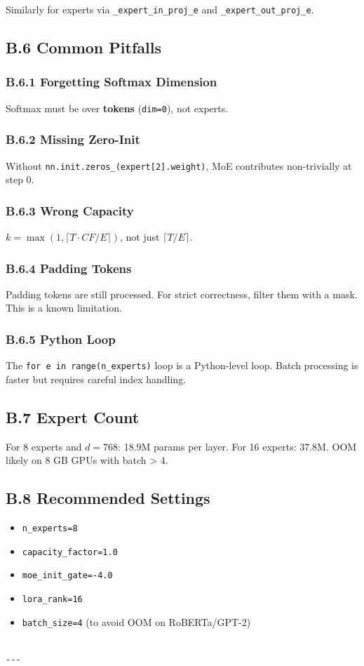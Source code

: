 Similarly for experts via \texttt{\_expert\_in\_proj\_{e}} and \texttt{\_expert\_out\_proj\_{e}}.

\subsection{B.6 Common Pitfalls}

\subsubsection{B.6.1 Forgetting Softmax Dimension}

Softmax must be over \textbf{tokens} (\texttt{dim=0}), not experts.

\subsubsection{B.6.2 Missing Zero-Init}

Without \texttt{nn.init.zeros\_(expert[2].weight)}, MoE contributes non-trivially 
at step 0.

\subsubsection{B.6.3 Wrong Capacity}

$k = \max(1, \lceil T \cdot CF / E \rceil)$, not just $\lceil T/E \rceil$.

\subsubsection{B.6.4 Padding Tokens}

Padding tokens are still processed. For strict correctness, filter them 
with a mask. This is a known limitation.

\subsubsection{B.6.5 Python Loop}

The \texttt{for e in range(n\_experts)} loop is a Python-level loop. Batch 
processing is faster but requires careful index handling.

\subsection{B.7 Expert Count}

For 8 experts and $d = 768$: 18.9M params per layer. For 16 experts: 
37.8M. OOM likely on 8 GB GPUs with batch > 4.

\subsection{B.8 Recommended Settings}

\begin{itemize}
\item \texttt{n\_experts=8}
\item \texttt{capacity\_factor=1.0}
\item \texttt{moe\_init\_gate=-4.0}
\item \texttt{lora\_rank=16}
\item \texttt{batch\_size=4} (to avoid OOM on RoBERTa/GPT-2)
\end{itemize}
\begin{lstlisting}

---
\end{lstlisting}
